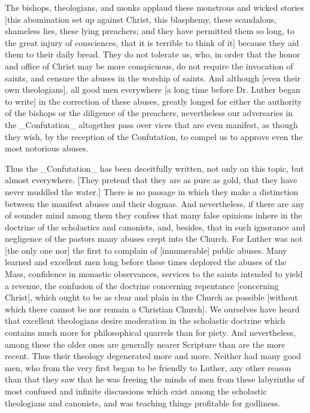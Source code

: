 The bishops, theologians, and monks applaud these monstrous and
wicked stories [this abomination set up against Christ, this
blasphemy, these scandalous, shameless lies, these lying preachers;
and they have permitted them so long, to the great injury of
consciences, that it is terrible to think of it] because they aid
them to their daily bread.  They do not tolerate us, who, in order
that the honor and office of Christ may be more conspicuous, do not
require the invocation of saints, and censure the abuses in the
worship of saints.  And although [even their own theologians], all
good men everywhere [a long time before Dr. Luther began to write] in
the correction of these abuses, greatly longed for either the
authority of the bishops or the diligence of the preachers,
nevertheless our adversaries in the _Confutation_ altogether pass
over vices that are even manifest, as though they wish, by the
reception of the Confutation, to compel us to approve even the most
notorious abuses.

Thus the _Confutation_ has been deceitfully written, not only on this
topic, but almost everywhere.  [They pretend that they are as pure as
gold, that they have never muddled the water.] There is no passage in
which they make a distinction between the manifest abuses and their
dogmas.  And nevertheless, if there are any of sounder mind among
them they confess that many false opinions inhere in the doctrine of
the scholastics and canonists, and, besides, that in such ignorance
and negligence of the pastors many abuses crept into the Church.  For
Luther was not [the only one nor] the first to complain of
[innumerable] public abuses.  Many learned and excellent men long
before these times deplored the abuses of the Mass, confidence in
monastic observances, services to the saints intended to yield a
revenue, the confusion of the doctrine concerning repentance
[concerning Christ], which ought to be as clear and plain in the
Church as possible [without which there cannot be nor remain a
Christian Church].  We ourselves have heard that excellent
theologians desire moderation in the scholastic doctrine which
contains much more for philosophical quarrels than for piety.  And
nevertheless, among these the older ones are generally nearer
Scripture than are the more recent.  Thus their theology degenerated
more and more.  Neither had many good men, who from the very first
began to be friendly to Luther, any other reason than that they saw
that he was freeing the minds of men from these labyrinths of most
confused and infinite discussions which exist among the scholastic
theologians and canonists, and was teaching things profitable for
godliness.

